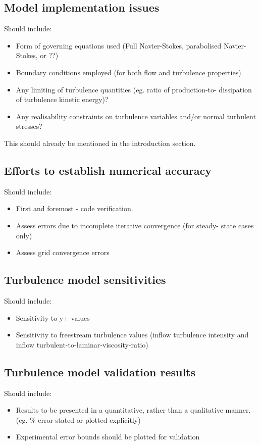 \subsection{Model implementation issues}
%
Should include:
\begin{itemize}
\item Form of governing equations used (Full Navier-Stokes, parabolised
      Navier-Stokes, or ??)
\item Boundary conditions employed (for both flow and turbulence
      properties)
\item Any limiting of turbulence quantities (eg. ratio of production-to-
      dissipation of turbulence kinetic energy)?
\item Any realisability constraints on turbulence variables and/or
      normal turbulent stresses?
\end{itemize}

\medskip
This should already be mentioned in the introduction section.

\subsection{Efforts to establish numerical accuracy}
%
Should include:
\begin{itemize}
\item First and foremost - code verification.
\item Assess errors due to incomplete iterative convergence (for steady-
      state cases only)
\item Assess grid convergence errors
\end{itemize}

\subsection{Turbulence model sensitivities}
%
Should include:
\begin{itemize}
\item Sensitivity to y+ values
\item Sensitivity to freestream turbulence values (inflow turbulence 
      intensity and inflow turbulent-to-laminar-viscosity-ratio)
\end{itemize}

\subsection{Turbulence model validation results}
%
Should include:
\begin{itemize}
\item Results to be presented in a quantitative, rather than a 
      qualitative manner. (eg. \% error stated or plotted explicitly)
\item Experimental error bounds should be plotted for validation
\end{itemize}

